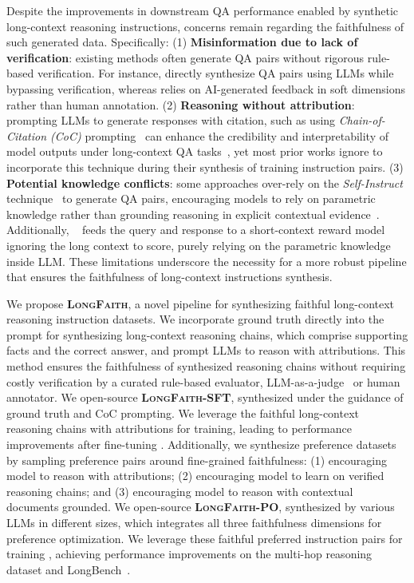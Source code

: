 Despite the improvements in downstream QA performance enabled by synthetic long-context reasoning instructions, concerns remain regarding the faithfulness of such generated data. Specifically: (1) \textbf{Misinformation due to lack of verification}: existing methods often generate QA pairs without rigorous rule-based verification. For instance, \cite{longmit, longreward, sealong} directly synthesize QA pairs using LLMs while bypassing verification, whereas \cite{longreward} relies on AI-generated feedback in soft dimensions rather than human annotation. (2) \textbf{Reasoning without attribution}: prompting LLMs to generate responses with citation, such as using \textit{Chain-of-Citation (CoC)} prompting~\cite{attribution, coc, learning, finegrained, cotar, alce} can enhance the credibility and interpretability of model outputs under long-context QA tasks~\cite{alce, longcite}, yet most prior works ignore to incorporate this technique during their synthesis of training instruction pairs. (3) \textbf{Potential knowledge conflicts}: some approaches \cite{longalign, longreward, longmit} over-rely on the \textit{Self-Instruct} technique~\cite{selfinstruct} to generate QA pairs, encouraging models to rely on parametric knowledge rather than grounding reasoning in explicit contextual evidence~\cite{knowledgeconflicts}. Additionally, ~\cite{longreward} feeds the query and response to a short-context reward model ignoring the long context to score, purely relying on the parametric knowledge inside LLM. These limitations underscore the necessity for a more robust pipeline that ensures the faithfulness of long-context instructions synthesis.

We propose \textbf{\textsc{LongFaith}}, a novel pipeline for synthesizing faithful long-context reasoning instruction datasets. We incorporate ground truth directly into the prompt for synthesizing long-context reasoning chains, which comprise supporting facts and the correct answer, and prompt LLMs to reason with attributions. This method ensures the faithfulness of synthesized reasoning chains without requiring costly verification by a curated rule-based evaluator, LLM-as-a-judge~\cite{llmasajudge} or human annotator. We open-source \textbf{\textsc{LongFaith}-SFT}, synthesized under the guidance of ground truth and CoC prompting. We leverage the faithful long-context reasoning chains with attributions for training, leading to performance improvements after fine-tuning \text{\llama}. Additionally, we synthesize preference datasets by sampling preference pairs around fine-grained faithfulness: (1) encouraging model to reason with attributions; (2) encouraging model to learn on verified reasoning chains; and (3) encouraging model to reason with contextual documents grounded. We open-source \textbf{\textsc{LongFaith}-PO}, synthesized by various LLMs in different sizes, which integrates all three faithfulness dimensions for preference optimization. We leverage these faithful preferred instruction pairs for training \llama, achieving performance improvements on the multi-hop reasoning dataset and LongBench~\cite{longbench}.

